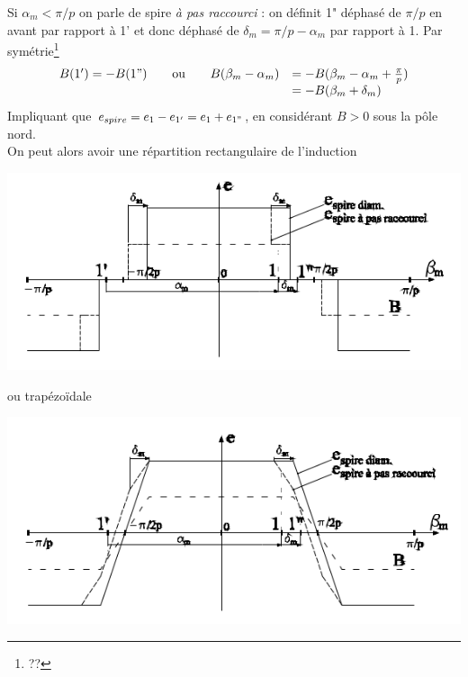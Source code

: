 		Si $\alpha_m<\pi/p$ on parle de spire \textit{à pas raccourci} : 
		on définit 1" déphasé de $\pi/p$ en avant par rapport à 1' et 
		donc déphasé de $\delta_m = \pi/p-\alpha_m$ par rapport à 1. Par 
		symétrie\footnote{??}
		\begin{equation}
		 \begin{array}{ll}
		B(1') = -B(1")\qquad\text{ou}\qquad B(\beta_m-\alpha_m) &=-B(\beta_m
		-\alpha_m+\frac{\pi}{p})\\
		&=-B(\beta_m+\delta_m)		
		\end{array}
		\end{equation}
		Impliquant que $e_{spire} = e_1-e_{1'}=e_1+e_{1"}$, en considérant 
		$B>0$ sous la pôle nord.\\
		On peut alors avoir une répartition rectangulaire de l'induction
		\begin{center}
		\includegraphics[scale=0.5]{ch4/image4}
		\end{center}
		ou  trapézoïdale 
		\begin{center}
		\includegraphics[scale=0.5]{ch4/image5}
		\end{center}
		
